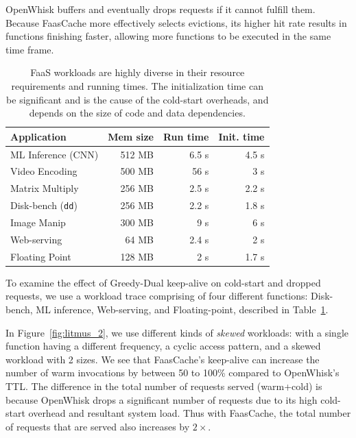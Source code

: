 OpenWhisk buffers and eventually drops requests if it cannot fulfill them.
Because FaasCache more effectively selects evictions, its higher hit rate results in functions finishing faster, allowing more functions to be executed in the same time frame.  
%
\begin{table}
  \centering
  \caption{FaaS workloads are highly diverse in their resource requirements and running times. The initialization time can be significant and is the cause of the cold-start overheads, and depends on the size of code and data dependencies.}
  \begin{tabular}{lrrr}
    \hline 
    Application & Mem size & Run time & Init. time \\
    \hline
    ML Inference (CNN) & 512 MB & 6.5 s & 4.5 s \\
    Video Encoding & 500 MB & 56 s & 3 s \\
    Matrix Multiply & 256 MB & 2.5 s & 2.2 s \\
    Disk-bench (\texttt{dd})  & 256 MB & 2.2 s & 1.8 s \\
    Image Manip & 300 MB & 9 s & 6 s \\
    Web-serving & 64 MB & 2.4 s & 2 s \\
    Floating Point & 128 MB & 2 s & 1.7 s \\
    \hline
  \end{tabular}
  \label{tab:workloads}
\end{table}

To examine the effect of Greedy-Dual keep-alive on cold-start and dropped requests, we use a workload trace comprising of four different functions: Disk-bench, ML inference, Web-serving, and Floating-point, described in Table~\ref{tab:workloads}.

In Figure~\ref{fig:litmus_2}, we use different kinds of \emph{skewed} workloads: with a single function having a different frequency, a cyclic access pattern, and a skewed workload with 2 sizes. 
We see that FaasCache's keep-alive can increase the number of warm invocations by between 50 to 100\% compared to OpenWhisk's TTL.
The difference in the total number of requests served (warm+cold) is because OpenWhisk drops a significant number of requests due to its high cold-start overhead and resultant system load. 
%
Thus with FaasCache, the total number of requests that are served also increases by $2\times$. 

